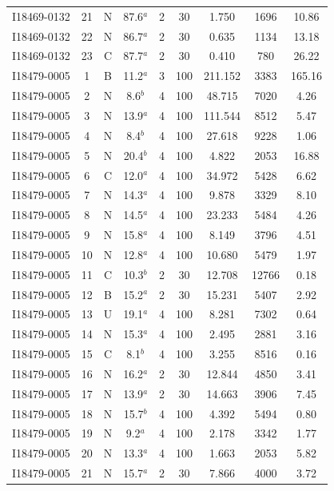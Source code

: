 \begin{table}
\begin{tabular}{ccccccccc}
I18469-0132 & 21 & N & 87.6$^{a}$ & 2 & 30 & 1.750 & 1696 & 10.86 \\
I18469-0132 & 22 & N & 86.7$^{a}$ & 2 & 30 & 0.635 & 1134 & 13.18 \\
I18469-0132 & 23 & C & 87.7$^{a}$ & 2 & 30 & 0.410 & 780 & 26.22 \\
I18479-0005 & 1 & B & 11.2$^{a}$ & 3 & 100 & 211.152 & 3383 & 165.16 \\
I18479-0005 & 2 & N & 8.6$^{b}$ & 4 & 100 & 48.715 & 7020 & 4.26 \\
I18479-0005 & 3 & N & 13.9$^{a}$ & 4 & 100 & 111.544 & 8512 & 5.47 \\
I18479-0005 & 4 & N & 8.4$^{b}$ & 4 & 100 & 27.618 & 9228 & 1.06 \\
I18479-0005 & 5 & N & 20.4$^{b}$ & 4 & 100 & 4.822 & 2053 & 16.88 \\
I18479-0005 & 6 & C & 12.0$^{a}$ & 4 & 100 & 34.972 & 5428 & 6.62 \\
I18479-0005 & 7 & N & 14.3$^{a}$ & 4 & 100 & 9.878 & 3329 & 8.10 \\
I18479-0005 & 8 & N & 14.5$^{a}$ & 4 & 100 & 23.233 & 5484 & 4.26 \\
I18479-0005 & 9 & N & 15.8$^{a}$ & 4 & 100 & 8.149 & 3796 & 4.51 \\
I18479-0005 & 10 & N & 12.8$^{a}$ & 4 & 100 & 10.680 & 5479 & 1.97 \\
I18479-0005 & 11 & C & 10.3$^{b}$ & 2 & 30 & 12.708 & 12766 & 0.18 \\
I18479-0005 & 12 & B & 15.2$^{a}$ & 2 & 30 & 15.231 & 5407 & 2.92 \\
I18479-0005 & 13 & U & 19.1$^{a}$ & 4 & 100 & 8.281 & 7302 & 0.64 \\
I18479-0005 & 14 & N & 15.3$^{a}$ & 4 & 100 & 2.495 & 2881 & 3.16 \\
I18479-0005 & 15 & C & 8.1$^{b}$ & 4 & 100 & 3.255 & 8516 & 0.16 \\
I18479-0005 & 16 & N & 16.2$^{a}$ & 2 & 30 & 12.844 & 4850 & 3.41 \\
I18479-0005 & 17 & N & 13.9$^{a}$ & 2 & 30 & 14.663 & 3906 & 7.45 \\
I18479-0005 & 18 & N & 15.7$^{b}$ & 4 & 100 & 4.392 & 5494 & 0.80 \\
I18479-0005 & 19 & N & 9.2$^{a}$ & 4 & 100 & 2.178 & 3342 & 1.77 \\
I18479-0005 & 20 & N & 13.3$^{a}$ & 4 & 100 & 1.663 & 2053 & 5.82 \\
I18479-0005 & 21 & N & 15.7$^{a}$ & 2 & 30 & 7.866 & 4000 & 3.72 \\

\end{tabular}
\end{table}
